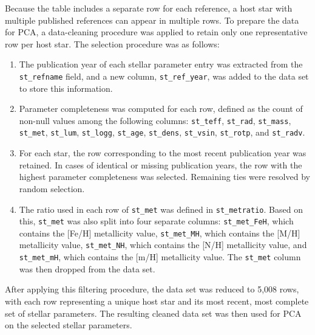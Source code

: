 \documentclass[preprint]{aastex631}
\begin{document}
Because the table includes a separate row for each reference, a host star with multiple published references can appear in multiple rows. To prepare the data for PCA, a data-cleaning procedure was applied to retain only one representative row per host star. The selection procedure was as follows:
\begin{enumerate}
  \item The publication year of each stellar parameter entry was extracted from the \verb|st_refname| field, and a new column, \verb|st_ref_year|, was added to the data set to store this information.

  \item Parameter completeness was computed for each row, defined as the count of non-null values among the following columns: \verb|st_teff|, \verb|st_rad|, \verb|st_mass|, \verb|st_met|, \verb|st_lum|, \verb|st_logg|, \verb|st_age|, \verb|st_dens|, \verb|st_vsin|, \verb|st_rotp|, and \verb|st_radv|.

  \item For each star, the row corresponding to the most recent publication year was retained. In cases of identical or missing publication years, the row with the highest parameter completeness was selected. Remaining ties were resolved by random selection.
  
  \item The ratio used in each row of \verb|st_met| was defined in \verb|st_metratio|. Based on this, \verb|st_met| was also split into four separate columns: \verb|st_met_FeH|, which contains the [Fe/H] metallicity value, \verb|st_met_MH|, which contains the [M/H] metallicity value, \verb|st_met_NH|, which contains the [N/H] metallicity value, and \verb|st_met_mH|, which contains the [m/H] metallicity value. The \verb|st_met| column was then dropped from the data set.

\end{enumerate}
After applying this filtering procedure, the data set was reduced to 5,008 rows, with each row representing a unique host star and its most recent, most complete set of stellar parameters. The resulting cleaned data set was then used for PCA on the selected stellar parameters.
\end{document}
